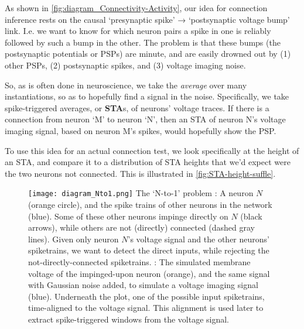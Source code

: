 
As shown in \cref{fig:diagram_Connectivity-Activity}, our idea for connection inference rests on the causal `presynaptic spike' → `postsynaptic voltage bump' link. I.e. we want to know for which neuron pairs a spike in one is reliably followed by such a bump in the other. The problem is that these bumps (the postsynaptic potentials or PSPs) are minute, and are easily drowned out by (1) other PSPs, (2) postsynaptic spikes, and (3) voltage imaging noise.

So, as is often done in neuroscience, we take the \emph{average} over many instantiations, so as to hopefully find a signal in the noise. Specifically, we take spike-triggered averages, or \textbf{STA}s, of neurons' voltage traces. If there is a connection from neuron `M' to neuron `N', then an STA of neuron N's voltage imaging signal, based on neuron M's spikes, would hopefully show the PSP.

To use this idea for an actual connection test, we look specifically at the height of an STA, and compare it to a distribution of STA heights that we'd expect were the two neurons not connected. This is illustrated in \cref{fig:STA-height-suffle}.


\begin{figure}
    \vspace*{2em}
    \hspace*{-1em}
    \texttt{[image: diagram\_Nto1.png]}
    \vspace*{-1.4em}
    \captionn
        {The `N-to-1' problem}
        {\Left: A neuron $N$ (orange circle), and the spike trains of other neurons in the network (blue). Some of these other neurons impinge directly on $N$ (black arrows), while others are not (directly) connected (dashed gray lines). Given only neuron $N$'s voltage signal and the other neurons' spiketrains, we want to detect the direct inputs, while rejecting the not-directly-connected spiketrains.\newline
        \Right: The simulated membrane voltage of the impinged-upon neuron (orange), and the same signal with Gaussian noise added, to simulate a voltage imaging signal (blue). Underneath the plot, one of the possible input spiketrains, time-aligned to the voltage signal.
        This alignment is used later to extract spike-triggered windows from the voltage signal.}
    \label{fig:diagram_Nto1}
\end{figure}

